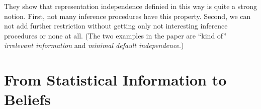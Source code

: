 \documentclass[a4wide]{article}
\begin{document}
They show that representation independence definied in this way is quite a strong notion. First, not
many inference procedures have this property. Second, we can not add further restriction without
getting only not interesting inference procedures or none at all. (The two examples in 
the paper are ``kind of'' \emph{irrelevant information} and \emph{minimal default independence}.)




\section{From Statistical Information to Beliefs \cite{BacchusGHK96}}






\end{document}
